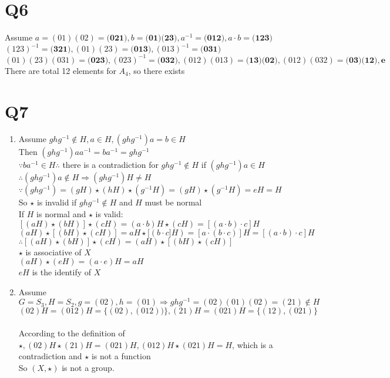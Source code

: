 \documentclass[12pt]{article}
\begin{document}
\section{Q6}
Assume $a=(01)(02)=\textbf{(021)},b=\textbf{(01)(23)},a^{-1}=\textbf{(012)},a\cdot b=\textbf{(123)}$
\\$(123)^{-1}=\textbf{(321)},(01)(23)=\textbf{(013)},(013)^{-1}=\textbf{(031)}$
\\$(01)(23)(031)=\textbf{(023)},(023)^{-1}=\textbf{(032)},(012)(013)=\textbf{(13)(02)},(012)(032)=\textbf{(03)(12)},\textbf{e}$
\\There are total 12 elements for $A_4$, so there exists
\section{Q7}
\begin{enumerate}
\item 
\par Assume $ghg^{-1}\notin H,a\in H,(ghg^{-1})a=b\in H$
\\Then $(ghg^{-1})aa^{-1}=ba^{-1}=ghg^{-1}$
\\$\because ba^{-1}\in H\therefore$ there is a contradiction for $ghg^{-1}\notin H$ if $(ghg^{-1})a\in H$
\\$\therefore (ghg^{-1})a\notin H\Rightarrow (ghg^{-1})H\neq H$
\\$\because (ghg^{-1})=(gH)\star(hH)\star(g^{-1}H)=(gH)\star(g^{-1}H)=eH=H$
\\So $\star$ is invalid if $ghg^{-1}\notin H$ and $H$ must be normal
\\If $H$ is normal and $\star$ is valid:
\\$[(aH)\star(bH)]\star(cH)=(a\cdot b)H\star(cH)=[(a\cdot b)\cdot c]H$
\\$(aH)\star[(bH)\star(cH)]=aH\star[(b\cdot c]H)=[a\cdot(b\cdot c)]H=[(a\cdot b)\cdot c]H$
\\$\therefore [(aH)\star(bH)]\star(cH)=(aH)\star[(bH)\star(cH)]$
\\$\star$ is associative of $X$
\\$(aH)\star(eH)=(a\cdot e)H=aH$
\\$eH$ is the identify of $X$
\item Assume $G=S_3,H=S_2,g=(02),h=(01)\Rightarrow ghg^{-1}=(02)(01)(02)=(21)\notin H$
\\$(02)H=(012)H=\{(02),(012))\},(21)H=(021)H=\{(12),(021)\}$\\
\\According to the definition of $\star, (02)H\star (21)H=(021)H,(012)H\star(021)H=H$, which is a contradiction and $\star$ is not a function
\\So $(X,\star)$ is not a group.
\end{enumerate}
\end{document}
